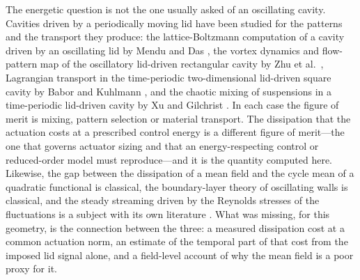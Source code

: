 \documentclass[11pt,a4paper]{article}
\newenvironment{chgadd}{\par\color{blue}}{\par\color{black}}
\begin{document}
\begin{chgadd}
The energetic question is not the one usually asked of an oscillating cavity.
Cavities driven by a periodically moving lid have been studied for the patterns and
the transport they produce: the lattice-Boltzmann computation of a cavity driven by
an oscillating lid by Mendu and Das \cite{mendu2013oscillating}, the vortex
dynamics and flow-pattern map of the oscillatory lid-driven rectangular cavity by
Zhu et al.~\cite{zhu2020oscillatory}, Lagrangian transport in the time-periodic
two-dimensional lid-driven square cavity by Babor and Kuhlmann
\cite{babor2023transport}, and the chaotic mixing of suspensions in a
time-periodic lid-driven cavity by Xu and Gilchrist \cite{xu2010mixing}. In each
case the figure of merit is mixing, pattern selection or material transport. The
dissipation that the actuation costs at a prescribed control energy is a different
figure of merit---the one that governs actuator sizing and that an
energy-respecting control or reduced-order model must reproduce---and it is the
quantity computed here. Likewise, the gap between the dissipation of a mean field
and the cycle mean of a quadratic functional is classical, the boundary-layer
theory of oscillating walls is classical, and the steady streaming driven by the
Reynolds stresses of the fluctuations is a subject with its own
literature \cite{riley2001streaming}. What was missing, for this geometry, is the
connection between the three: a measured dissipation cost at a common actuation
norm, an estimate of the temporal part of that cost from the imposed lid signal
alone, and a field-level account of why the mean field is a poor proxy for it.


\end{chgadd}
\end{document}
